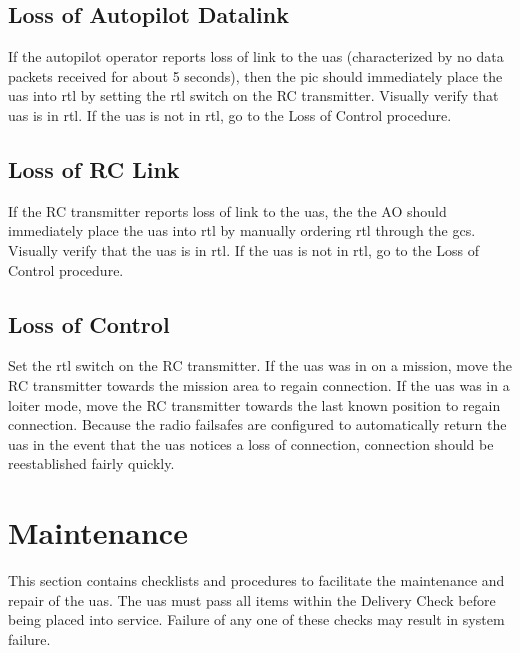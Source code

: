 \documentclass{report}
\begin{document}
	\section{Loss of Autopilot Datalink}
		If the autopilot operator reports loss of link to the \gls{uas} (characterized by no data packets received for about 5 seconds), then the \gls{pic} should immediately place the \gls{uas} into \gls{rtl} by setting the \gls{rtl} switch on the RC transmitter.  Visually verify that \gls{uas} is in \gls{rtl}.  If the \gls{uas} is not in \gls{rtl}, go to the Loss of Control procedure.
	\section{Loss of RC Link}
		If the RC transmitter reports loss of link to the \gls{uas}, the the \gls{AO} should immediately place the \gls{uas} into \gls{rtl} by manually ordering \gls{rtl} through the \gls{gcs}.  Visually verify that the \gls{uas} is in \gls{rtl}.  If the \gls{uas} is not in \gls{rtl}, go to the Loss of Control procedure.
	\section{Loss of Control}
		Set the \gls{rtl} switch on the RC transmitter.  If the \gls{uas} was in on a mission, move the RC transmitter towards the mission area to regain connection.  If the \gls{uas} was in a loiter mode, move the RC transmitter towards the last known position to regain connection.  Because the radio failsafes are configured to automatically return the \gls{uas} in the event that the \gls{uas} notices a loss of connection, connection should be reestablished fairly quickly.
\chapter{Maintenance}
	This section contains checklists and procedures to facilitate the maintenance and repair of the \gls{uas}.  The \gls{uas} must pass all items within the Delivery Check before being placed into service.  Failure of any one of these checks may result in system failure.
\end{document}
